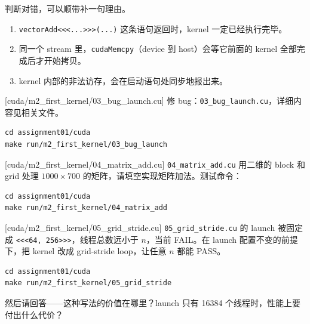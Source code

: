 \documentclass[11pt,a4paper,fontset=none]{ctexart}
\begin{document}
判断对错，可以顺带补一句理由。
\begin{enumerate}[label=(\alph*)]
  \item \texttt{vectorAdd<<<...>>>(...)} 这条语句返回时，kernel 一定已经执行完毕。
  \item 同一个 stream 里，\texttt{cudaMemcpy}（device 到 host）会等它前面的 kernel 全部完成后才开始拷贝。
  \item kernel 内部的非法访存，会在启动语句处同步地报出来。
\end{enumerate}

[cuda/m2\_first\_kernel/03\_bug\_launch.cu]
修 bug：\texttt{03\_bug\_launch.cu}，详细内容见相关文件。

\begin{lstlisting}
cd assignment01/cuda
make run/m2_first_kernel/03_bug_launch
\end{lstlisting}


[cuda/m2\_first\_kernel/04\_matrix\_add.cu]
\texttt{04\_matrix\_add.cu} 用二维的 block 和 grid 处理 $1000 \times 700$ 的矩阵，请填空实现矩阵加法。测试命令：

\begin{lstlisting}
cd assignment01/cuda
make run/m2_first_kernel/04_matrix_add
\end{lstlisting}

[cuda/m2\_first\_kernel/05\_grid\_stride.cu]
\texttt{05\_grid\_stride.cu} 的 launch 被固定成 \texttt{<<<64, 256>>>}，线程总数远小于 $n$，当前 FAIL。在 launch 配置不变的前提下，把 kernel 改成 grid-stride loop，让任意 $n$ 都能 PASS。

\begin{lstlisting}
cd assignment01/cuda
make run/m2_first_kernel/05_grid_stride
\end{lstlisting}

然后请回答——这种写法的价值在哪里？launch 只有 16384 个线程时，性能上要付出什么代价？
\end{document}
